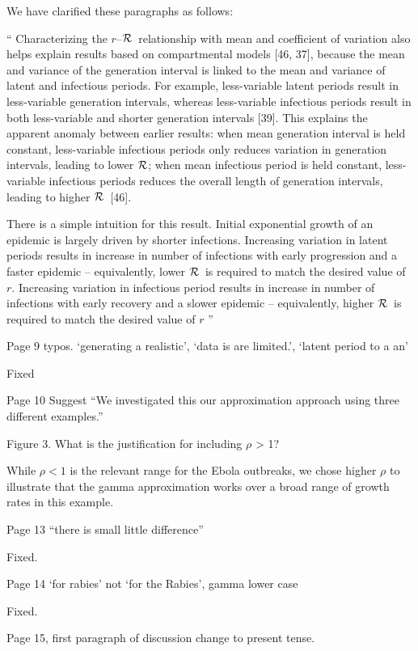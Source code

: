 \documentclass[12pt]{article}
\newcommand{\rR}{\mbox{$r$--$\cal R$}}
\newcommand{\RR}{\ensuremath{{\cal R}}}
\newcommand{\revtext}{\textsf}
\begin{document}
We have clarified these paragraphs as follows:

``
Characterizing the \rR\ relationship with mean and coefficient of variation also helps explain results based on compartmental models [46, 37], because the mean and variance of the generation interval is linked to the mean and variance of latent and infectious periods.
For example, less-variable latent periods result in less-variable generation intervals, whereas less-variable infectious periods result in both less-variable and shorter generation intervals [39].
This explains the apparent anomaly between earlier results: 
when mean generation interval is held constant, less-variable infectious periods only reduces variation in generation intervals, leading to lower \RR;
when mean infectious period is held constant, less-variable infectious periods reduces the overall length of generation intervals, leading to higher \RR\ [46].

There is a simple intuition for this result.
Initial exponential growth of an epidemic is largely driven by shorter infections.
Increasing variation in latent periods results in increase in number of infections with early progression and a faster epidemic -- equivalently, lower \RR\ is required to match the desired value of $r$.
Increasing variation in infectious period results in increase in number of infections with early recovery and a slower epidemic -- equivalently, higher \RR\ is required to match the desired value of $r$
''


\revtext{Page 9 typos. ‘generating a realistic’, ‘data is are limited.’, ‘latent period to a an’}

Fixed

\revtext{Page 10 Suggest “We investigated this our approximation approach using three different examples.”}

\revtext{Figure 3. What is the justification for including $\rho$ > 1?}

While $\rho < 1$ is the relevant range for the Ebola outbreaks, we chose higher $\rho$ to illustrate that the gamma approximation works over a broad range of growth rates in this example.

\revtext{Page 13 “there is small little difference”}

Fixed.

\revtext{Page 14 ‘for rabies’ not ‘for the Rabies’, gamma lower case}

Fixed.

\revtext{Page 15, first paragraph of discussion change to present tense.}
\end{document}
